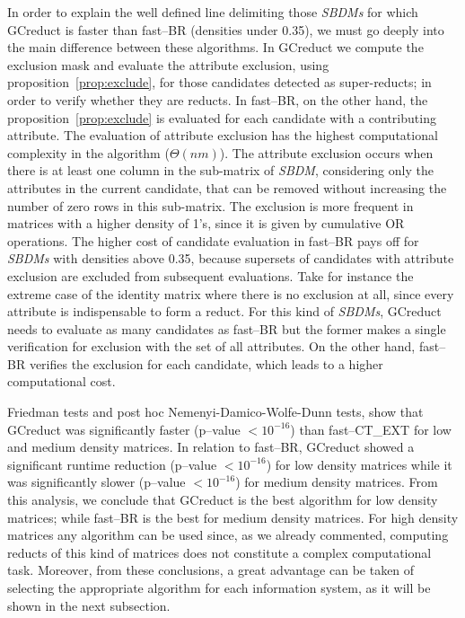 \documentclass[authoryear,preprint,review,12pt]{elsarticle}
\begin{document}
		
	In order to explain the well defined line delimiting those \textit{SBDMs} for which GCreduct is faster than fast--BR (densities under 0.35),  we must go deeply into the main difference between these algorithms. In GCreduct we compute the exclusion mask and evaluate the attribute exclusion, using proposition~\ref{prop:exclude}, for those candidates detected as super-reducts; in order to verify whether they are reducts. In fast--BR, on the other hand, the proposition~\ref{prop:exclude} is evaluated for each candidate with a contributing attribute. The evaluation of attribute exclusion has the highest computational complexity in the algorithm ($\Theta (nm)$). The attribute exclusion occurs when there is at least one column in the sub-matrix of \textit{SBDM}, considering only the attributes in the current candidate, that can be removed without increasing the number of zero rows in this sub-matrix. The exclusion is more frequent in matrices with a higher density of 1's, since it is given by cumulative OR operations. The higher cost of candidate evaluation in fast--BR pays off for \textit{SBDMs} with densities above 0.35, because supersets of candidates with attribute exclusion are excluded from subsequent evaluations. Take for instance the extreme case of the identity matrix where there is no exclusion at all, since every attribute is indispensable to form a reduct. For this kind of \textit{SBDMs}, GCreduct needs to evaluate as many candidates as fast--BR but the former makes a single verification for exclusion with the set of all attributes. On the other hand, fast--BR verifies the exclusion for each candidate, which leads to a higher computational cost.
	
	Friedman tests and post hoc Nemenyi-Damico-Wolfe-Dunn tests, show that GCreduct was significantly faster (p--value $< 10^{-16}$) than fast--CT\_EXT for low and medium density matrices. 
	In relation to fast--BR, GCreduct showed a significant runtime reduction (p--value $< 10^{-16}$) for low density matrices while it was significantly slower (p--value $< 10^{-16}$) for medium density matrices. 
	From this analysis, we conclude that GCreduct is the best algorithm for low density matrices; while fast--BR is the best for medium density matrices. For high density matrices any algorithm can be used since, as we already commented, computing reducts of this kind of matrices does not constitute a complex computational task. Moreover, from these conclusions, a great advantage can be taken of selecting the appropriate algorithm for each information system, as it will be shown in the next subsection. 
	
\end{document}
